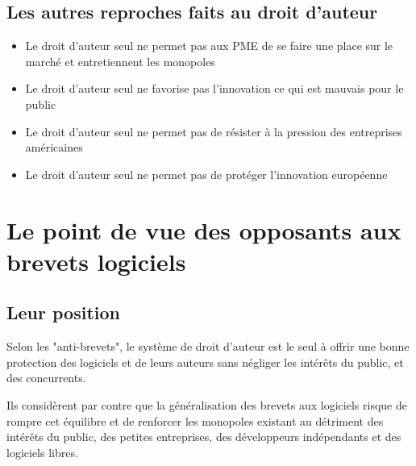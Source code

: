 \documentclass{report}
\begin{document}
\subsection{Les autres reproches faits au droit d'auteur}
\begin{itemize}
\item Le droit d'auteur seul ne permet pas aux PME de se faire une place sur le marché et entretiennent les monopoles
\item Le droit d'auteur seul ne favorise pas l'innovation ce qui est mauvais pour le public
\item Le droit d'auteur seul ne permet pas de résister à la pression des entreprises américaines
\item Le droit d'auteur seul ne permet pas de protéger l’innovation européenne
\end{itemize}

\section{Le point de vue des opposants aux brevets logiciels}
\subsection{Leur position}
Selon les "anti-brevets", le système de droit d'auteur est le seul à offrir une bonne protection des logiciels et de leurs auteurs sans négliger les intérêts du public, et des concurrents.

Ils considèrent par contre que la généralisation des brevets aux logiciels risque de rompre cet équilibre et de renforcer les monopoles existant au détriment des intérêts du public, des petites entreprises, des développeurs indépendants et des logiciels libres.
\end{document}
